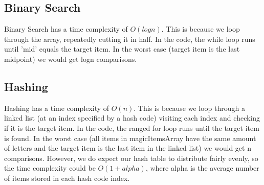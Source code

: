 \documentclass[letterpaper, 10pt,DIV=13]{scrartcl}
\numberwithin{equation}{section} %
\numberwithin{figure}{section} %
\numberwithin{table}{section} %
\begin{document}
\subsection{Binary Search} 
Binary Search has a time complexity of $O(logn)$. This is because we loop through the array, repeatedly cutting it in half. In the code, the while loop runs until 'mid' equals the target item. In the worst case (target item is the last midpoint) we would get logn comparisons.
\subsection{Hashing} 
Hashing has a time complexity of $O(n)$. This is because we loop through a linked list (at an index specified by a hash code) visiting each index and checking if it is the target item. In the code, the ranged for loop runs until the target item is found. In the worst case (all items in magicItemsArray have the same amount of letters and the target item is the last item in the linked list) we would get n comparisons. However, we do expect our hash table to distribute fairly evenly, so the time complexity could be $O(1 + alpha)$, where alpha is the average number of items stored in each hash code index.

\pagebreak
\end{document}
